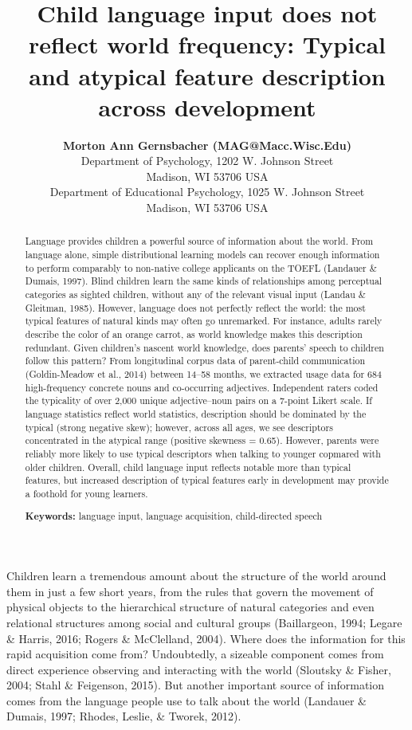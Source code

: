 \documentclass[10pt, letterpaper]{article}
\title{Child language input does not reflect world frequency: Typical and
atypical feature description across development}
\author{{\large \bf Morton Ann Gernsbacher (MAG@Macc.Wisc.Edu)} \\ Department of Psychology, 1202 W. Johnson Street \\ Madison, WI 53706 USA \AND {\large \bf Sharon J.~Derry (SDJ@Macc.Wisc.Edu)} \\ Department of Educational Psychology, 1025 W. Johnson Street \\ Madison, WI 53706 USA}
\begin{document}
\maketitle

\begin{abstract}
Language provides children a powerful source of information about the
world. From language alone, simple distributional learning models can
recover enough information to perform comparably to non-native college
applicants on the TOEFL (Landauer \& Dumais, 1997). Blind children learn
the same kinds of relationships among perceptual categories as sighted
children, without any of the relevant visual input (Landau \& Gleitman,
1985). However, language does not perfectly reflect the world: the most
typical features of natural kinds may often go unremarked. For instance,
adults rarely describe the color of an orange carrot, as world knowledge
makes this description redundant. Given children's nascent world
knowledge, does parents' speech to children follow this pattern? From
longitudinal corpus data of parent-child communication (Goldin-Meadow et
al., 2014) between 14--58 months, we extracted usage data for 684
high-frequency concrete nouns and co-occurring adjectives. Independent
raters coded the typicality of over 2,000 unique adjective--noun pairs
on a 7-point Likert scale. If language statistics reflect world
statistics, description should be dominated by the typical (strong
negative skew); however, across all ages, we see descriptors
concentrated in the atypical range (positive skewness = 0.65). However,
parents were reliably more likely to use typical descriptors when
talking to younger copmared with older children. Overall, child language
input reflects notable more than typical features, but increased
description of typical features early in development may provide a
foothold for young learners.

\textbf{Keywords:}
language input, language acquisition, child-directed speech
\end{abstract}

Children learn a tremendous amount about the structure of the world
around them in just a few short years, from the rules that govern the
movement of physical objects to the hierarchical structure of natural
categories and even relational structures among social and cultural
groups (Baillargeon, 1994; Legare \& Harris, 2016; Rogers \& McClelland,
2004). Where does the information for this rapid acquisition come from?
Undoubtedly, a sizeable component comes from direct experience observing
and interacting with the world (Sloutsky \& Fisher, 2004; Stahl \&
Feigenson, 2015). But another important source of information comes from
the language people use to talk about the world (Landauer \& Dumais,
1997; Rhodes, Leslie, \& Tworek, 2012).
\end{document}
